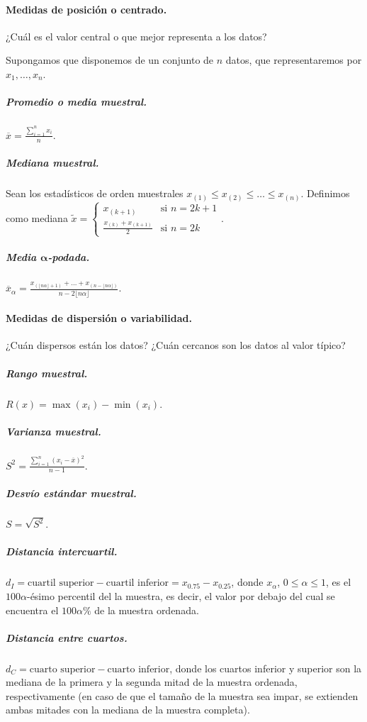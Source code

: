 \documentclass[11pt]{article}
\theoremstyle{plain}
\theoremstyle{definition}
\theoremstyle{remark}
\begin{document}
      \paragraph{Medidas de posición o centrado.} ¿Cuál es el valor central o que mejor representa a los datos?

      Supongamos que disponemos de un conjunto de $n$ datos, que representaremos por $x_1, \dots, x_n$.

      \subparagraph{Promedio o media muestral.} $\displaystyle \overline{x} = \frac{\sum_{i=1}^n x_i}{n}$.

      \subparagraph{Mediana muestral.} Sean los estadísticos de orden muestrales $x_{(1)} \leq x_{(2)} \leq \dots \leq x_{(n)}$. Definimos como mediana $\tilde x = \begin{cases}
        \displaystyle x_{(k+1)} & \text{si $n = 2k + 1$} \\
        \displaystyle \frac{x_{(k)} + x_{(k + 1)}}{2} & \text{si $n = 2k$}
      \end{cases}$.

      \subparagraph{Media $\boldsymbol\alpha$-podada.} $\displaystyle \overline{x}_\alpha = \frac{x_{(\lfloor n \alpha \rfloor + 1)} + \dots + x_{(n - \lfloor n \alpha \rfloor)}}{n - 2 \lfloor n \alpha \rfloor}$.

      \paragraph{Medidas de dispersión o variabilidad.} ¿Cuán dispersos están los datos? ¿Cuán cercanos son los datos al valor típico?

      \subparagraph{Rango muestral.} $\displaystyle R(x) = \max(x_i) - \min(x_i)$.

      \subparagraph{Varianza muestral.} $\displaystyle S^2 = \frac{\sum_{i=1}^n (x_i - \overline{x})^2}{n - 1}$.

      \subparagraph{Desvío estándar muestral.} $S = \sqrt{S^2}$.
      
      \subparagraph{Distancia intercuartil.} $d_I = \text{cuartil superior} - \text{cuartil inferior} = x_{0.75} - x_{0.25}$, donde $x_\alpha$, $0 \leq \alpha \leq 1$, es el $100 \alpha$-ésimo percentil del la muestra, es decir, el valor por debajo del cual se encuentra el $100 \alpha \%$ de la muestra ordenada.

      \subparagraph{Distancia entre cuartos.} $d_C = \text{cuarto superior} - \text{cuarto inferior}$, donde los cuartos inferior y superior son la mediana de la primera y la segunda mitad de la muestra ordenada, respectivamente (en caso de que el tamaño de la muestra sea impar, se extienden ambas mitades con la mediana de la muestra completa).
\end{document}
